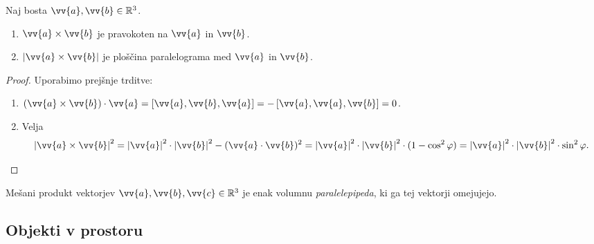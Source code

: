 \documentclass[12pt, a4paper]{article}
\begin{document}
\begin{trditev}
Naj bosta $\vv{a},\vv{b}\in\R^3$.

\begin{enumerate}[label=\alph*)]
\item $\vv{a}\times\vv{b}$ je pravokoten na $\vv{a}$ in $\vv{b}$.
\item $\left|\vv{a}\times\vv{b}\right|$ je ploščina paralelograma med $\vv{a}$ in $\vv{b}$.
\end{enumerate}
\end{trditev}

\begin{proof}
Uporabimo prejšnje trditve:

\begin{enumerate}[label=\alph*)]
\item $(\vv{a}\times\vv{b})\cdot\vv{a}=\left[\vv{a},\vv{b},\vv{a}\right]=-\left[\vv{a},\vv{a},\vv{b}\right]=0$.
\item Velja
\[
\left|\vv{a}\times\vv{b}\right|^2
=\left|\vv{a}\right|^2\cdot\left|\vv{b}\right|^2-(\vv{a}\cdot\vv{b})^2
=\left|\vv{a}\right|^2\cdot\left|\vv{b}\right|^2\cdot(1-\cos^2\varphi)
=\left|\vv{a}\right|^2\cdot\left|\vv{b}\right|^2\cdot\sin^2\varphi.\qedhere
\]
\end{enumerate}
\end{proof}

\begin{trditev}
Mešani produkt vektorjev $\vv{a},\vv{b},\vv{c}\in\R^3$ je enak volumnu \emph{paralelepipeda}, ki ga tej vektorji omejujejo.
\end{trditev}

\newpage

\subsection{Objekti v prostoru}
\end{document}
